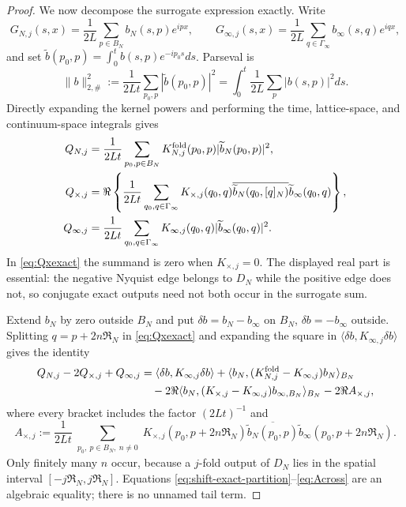 \documentclass[11pt,a4paper]{article}
\theoremstyle{plain}
\theoremstyle{definition}
\begin{document}
\begin{proof}
We now decompose the surrogate expression exactly.  Write
\[
 G_{N,j}(s,x)=\frac1{2L}\sum_{p\in B_N}b_N(s,p)e^{ipx},\qquad
 G_{\infty,j}(s,x)=\frac1{2L}\sum_{q\in\Gamma_\infty}b_\infty(s,q)e^{iqx},
\]
and set $\widetilde b(p_0,p)=\int_0^tb(s,p)e^{-ip_0s}ds$.  Parseval is
\begin{equation}
 \|b\|_{2,\#}^2:=\frac1{2Lt}\sum_{p_0,p}|\widetilde b(p_0,p)|^2
 =\int_0^t\frac1{2L}\sum_p|b(s,p)|^2ds.                           \label{eq:bparseval}
\end{equation}
Directly expanding the kernel powers and performing the time, lattice-space, and
continuum-space integrals gives
\begin{align}
 Q_{N,j}&=\frac1{2Lt}\sum_{p_0,p\in B_N}
 K_{N,j}^{\rm fold}(p_0,p)|\widetilde b_N(p_0,p)|^2,               \label{eq:QNexact}\\
 Q_{\times,j}&=\Re\left\{\frac1{2Lt}\sum_{q_0,q\in\Gamma_\infty}
 K_{\times,j}(q_0,q)
 \overline{\widetilde b_N(q_0,[q]_N)}\widetilde b_\infty(q_0,q)\right\}, \label{eq:Qxexact}\\
 Q_{\infty,j}&=\frac1{2Lt}\sum_{q_0,q\in\Gamma_\infty}
 K_{\infty,j}(q_0,q)|\widetilde b_\infty(q_0,q)|^2.              \label{eq:Qinfexact}
\end{align}
In \eqref{eq:Qxexact} the summand is zero when $K_{\times,j}=0$.  The displayed
real part is essential: the negative Nyquist edge belongs to $D_N$ while the
positive edge does not, so conjugate exact outputs need not both occur in the
surrogate sum.

Extend $b_N$ by zero outside $B_N$ and put
$\delta b=b_N-b_\infty$ on $B_N$, $\delta b=-b_\infty$ outside.  Splitting
$q=p+2n\mathfrak R_N$ in \eqref{eq:Qxexact} and expanding the square in
$\langle\delta b,K_{\infty,j}\delta b\rangle$ gives the identity
\begin{align}
 Q_{N,j}-2Q_{\times,j}+Q_{\infty,j}
 &=\langle\delta b,K_{\infty,j}\delta b\rangle
 +\langle b_N,(K_{N,j}^{\rm fold}-K_{\infty,j})b_N\rangle_{B_N}\notag\\
 &\quad-2\Re\langle b_N,(K_{\times,j}-K_{\infty,j})
                    b_{\infty,B_N}\rangle_{B_N}
 -2\Re A_{\times,j},                                                \label{eq:shift-exact-partition}
\end{align}
where every bracket includes the factor $(2Lt)^{-1}$ and
\begin{equation}
 A_{\times,j}:=\frac1{2Lt}
 \sum_{\substack{p_0,\ p\in B_N,\ n\ne0}}
 K_{\times,j}(p_0,p+2n\mathfrak R_N)
 \overline{\widetilde b_N(p_0,p)}
 \widetilde b_\infty(p_0,p+2n\mathfrak R_N).                       \label{eq:Across}
\end{equation}
Only finitely many $n$ occur, because a $j$-fold output of $D_N$ lies in the
spatial interval $[-j\mathfrak R_N,j\mathfrak R_N]$.  Equations
\eqref{eq:shift-exact-partition}--\eqref{eq:Across} are an algebraic equality;
there is no unnamed tail term.


\end{proof}
\end{document}
